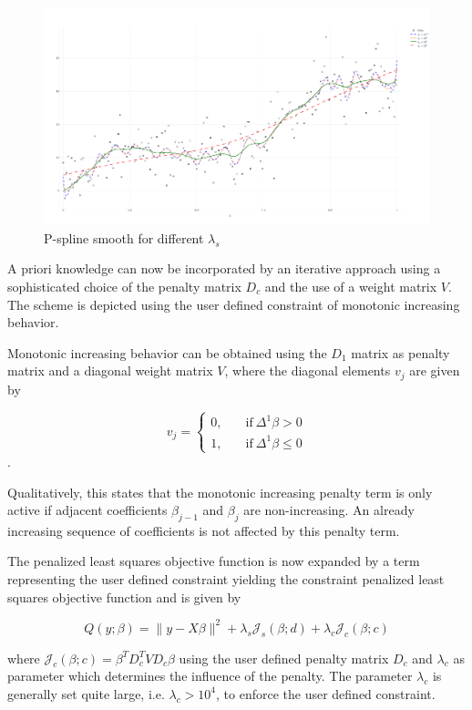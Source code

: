 \documentclass[10pt,a4paper]{article}
\begin{document}
	
	
	\begin{figure}[H]
		\centering
		\includegraphics[width=\linewidth]{thesisplots/p_splines.pdf}
		\caption{P-spline smooth for different $\lambda_s$}
		\label{fig:pspline}
	\end{figure}
			
	A priori knowledge can now be incorporated by an iterative approach using a sophisticated choice of the penalty matrix $D_c$ and the use of a weight matrix $V$. The scheme is depicted using the user defined constraint of monotonic increasing behavior.  
	
	Monotonic increasing behavior can be obtained using the $D_1$ matrix as penalty matrix and a diagonal weight matrix $V$, where the diagonal elements $v_j$ are given by
	
	$$v_j = \begin{cases} 0, & \quad \text{if} \ \Delta^1 \beta > 0 \\ 
						  1, & \quad \text{if} \ \Delta^1 \beta \le 0 
		 	\end{cases}$$.
	
	Qualitatively, this states that the monotonic increasing penalty term is only active if adjacent coefficients $\beta_{j-1}$ and $\beta_j$ are non-increasing. An already increasing sequence of coefficients is not affected by this penalty term. 
	
	The penalized least squares objective function is now expanded by a term representing the user defined constraint yielding the constraint penalized least squares objective function and is given by
	
	$$Q(y; \beta) = \lVert y - X\beta \rVert^2 + \lambda_s \mathcal J_s(\beta; d) + \lambda_c \mathcal J_c(\beta; c) $$
	
	where $\mathcal J_c(\beta; c) = \beta^T D_c^T V D_c \beta$ using the user defined penalty matrix $D_c$ and $\lambda_c$ as parameter which determines the influence of the penalty. The parameter $\lambda_c$ is generally set quite large, i.e. $\lambda_c > 10^4$, to enforce the user defined constraint. 
	
\end{document}

